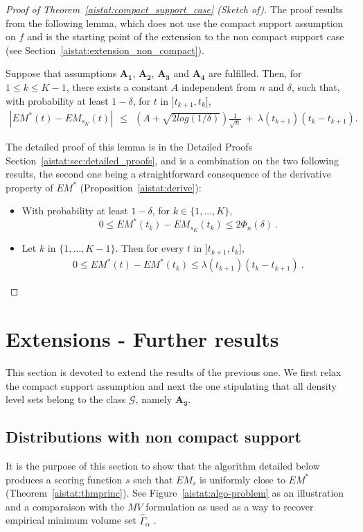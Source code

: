\begin{proof}[Proof of Theorem~\ref{aistat:compact_support_case} (Sketch of)]
The proof results from the following lemma, which does not use the compact support assumption on $f$ and is the starting point of the extension to the non compact support case (see Section~\ref{aistat:extension_non_compact}).
\begin{lemma} 
\label{aistat:theofini} Suppose that assumptions $\mathbf{A_1}$, $\mathbf{A_2}$, $\mathbf{A_3}$ and
  $\mathbf{A_4}$ are fulfilled. Then, for $1 \le k \le K-1$, there exists a constant $A$ independent from $n$ and  $\delta$, such that, with probability at least $1-\delta$, for $t$ in $]t_{k+1},t_{k}]$, 
\begin{align*}
|EM^*(t)-EM_{s_K}(t)| ~~\le~~\left(A+\sqrt{2log(1/\delta)}\right)\frac{1}{\sqrt n} ~+~ \lambda(t_{k+1})(t_{k}-t_{k+1}).
\end{align*}
\end{lemma}
The detailed proof of this lemma is in the Detailed Proofs Section~\ref{aistat:sec:detailed_proofs}, and is a combination on the two following results, the second one being a straightforward consequence of the derivative property of $EM^*$ (Proposition~\ref{aistat:derive}):
\begin{itemize}
\item With probability at least $1-\delta$, for $k \in \{1,...,K\}$, $$0 \le EM^*(t_{k})-EM_{s_K}(t_k) \le 2 \Phi_n(\delta)~.$$ 
\item Let $k$ in $\{1,...,K-1\}$. Then for every $t$ in $]t_{k+1},t_{k}]$,
\begin{align*}
0 \le EM^*(t)-EM^*(t_{k}) \le \lambda(t_{k+1}) (t_{k}-t_{k+1})~.
\end{align*}
\end{itemize}
\end{proof}









\section{Extensions - Further results}\label{aistat:sec:ext}
This section is devoted to extend the results of the previous one. We first relax the compact support assumption and next the one stipulating that all density level sets belong to the class $\mathcal{G}$, namely $\mathbf{A_3}$.

\subsection{Distributions with non compact support}\label{aistat:sec:infiniteSupport}
\label{aistat:extension_non_compact}
It is the purpose of this section to show that the algorithm detailed below produces a scoring function $s$ such that  $EM_s$ is uniformly close to $EM^*$ (Theorem~\ref{aistat:thmprinc}). 
 See Figure~\ref{aistat:algo-problem} as an illustration and a comparaison with the $MV$ formulation as used as a way to recover empirical minimum volume set $\hat \Gamma_\alpha$ .

